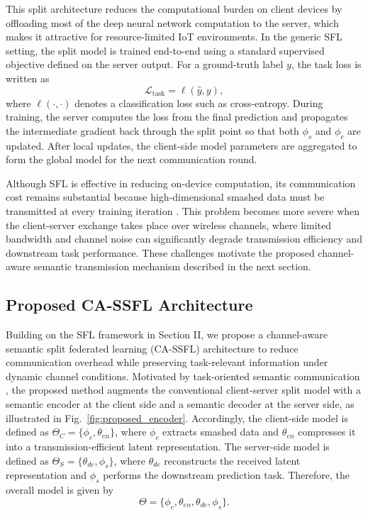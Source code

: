 This split architecture reduces the computational burden on client devices by offloading most of the deep neural network computation to the server, which makes it attractive for resource-limited IoT environments. In the generic SFL setting, the split model is trained end-to-end using a standard supervised objective defined on the server output. For a ground-truth label $y$, the task loss is written as
\begin{equation}
    \mathcal{L}_{\mathrm{task}} = \ell(\hat{y}, y),
\end{equation}
where $\ell(\cdot,\cdot)$ denotes a classification loss such as cross-entropy. During training, the server computes the loss from the final prediction and propagates the intermediate gradient back through the split point so that both $\phi_s$ and $\phi_c$ are updated. After local updates, the client-side model parameters are aggregated to form the global model for the next communication round.

Although SFL is effective in reducing on-device computation, its communication cost remains substantial because high-dimensional smashed data must be transmitted at every training iteration \cite{gao2020end}. This problem becomes more severe when the client-server exchange takes place over wireless channels, where limited bandwidth and channel noise can significantly degrade transmission efficiency and downstream task performance. These challenges motivate the proposed channel-aware semantic transmission mechanism described in the next section.

\subsection{Proposed CA-SSFL Architecture}
Building on the SFL framework in Section II, we propose a channel-aware semantic split federated learning (CA-SSFL) architecture to reduce communication overhead while preserving task-relevant information under dynamic channel conditions. Motivated by task-oriented semantic communication \cite{qin2021semantic,gunduz2022beyond}, the proposed method augments the conventional client-server split model with a semantic encoder at the client side and a semantic decoder at the server side, as illustrated in Fig.~\ref{fig:proposed_encoder}. Accordingly, the client-side model is defined as $\Theta_C = \{\phi_c, \theta_{en}\}$, where $\phi_c$ extracts smashed data and $\theta_{en}$ compresses it into a transmission-efficient latent representation. The server-side model is defined as $\Theta_S = \{\theta_{de}, \phi_s\}$, where $\theta_{de}$ reconstructs the received latent representation and $\phi_s$ performs the downstream prediction task. Therefore, the overall model is given by
\begin{equation}
\Theta = \{\phi_c, \theta_{en}, \theta_{de}, \phi_s\}.
\end{equation}

